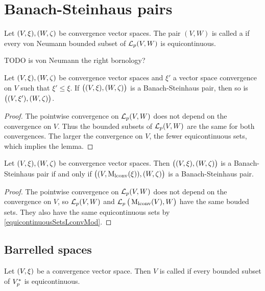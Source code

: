 \section{Banach-Steinhaus pairs}
\begin{definition}
Let $\sSet{V,\xi}, \sSet{W,\zeta}$ be convergence vector spaces. The pair $(V,W)$ is called a  if every von Neumann bounded subset of $\operatorname{\mathcal{L}}_p(V,W)$ is equicontinuous.
\end{definition}
TODO is von Neumann the right bornology?

\begin{lemma} \label{BanachSteinhausPairDomainInclusion}
Let $\sSet{V,\xi}, \sSet{W,\zeta}$ be convergence vector spaces and $\xi'$ a vector space convergence on $V$ such that $\xi'\leq \xi$. If $\big(\sSet{V,\xi}, \sSet{W,\zeta}\big)$ is a Banach-Steinhaus pair, then so is $\big(\sSet{V,\xi'}, \sSet{W,\zeta}\big)$.
\end{lemma}
\begin{proof}
The pointwise convergence on $\operatorname{\mathcal{L}}_p(V,W)$ does not depend on the convergence on $V$. Thus the bounded subsets of $\operatorname{\mathcal{L}}_p(V,W)$ are the same for both convergences. The larger the convergence on $V$, the fewer equicontinuous sets, which implies the lemma.
\end{proof}

\begin{proposition}
Let $\sSet{V,\xi}, \sSet{W,\zeta}$ be convergence vector spaces. Then $\big(\sSet{V,\xi}, \sSet{W,\zeta}\big)$ is a Banach-Steinhaus pair \textup{if and only if} $\big(\sSet{V,\lconvMod(\xi)}, \sSet{W,\zeta}\big)$ is a Banach-Steinhaus pair.
\end{proposition}
\begin{proof}
The pointwise convergence on $\operatorname{\mathcal{L}}_p(V,W)$ does not depend on the convergence on $V$, so $\operatorname{\mathcal{L}}_p(V,W)$ and $\operatorname{\mathcal{L}}_p\big(\operatorname{M_\text{lconv}}(V),W\big)$ have the same bouded sets. They also have the same equicontinuous sets by \ref{equicontinuousSetsLconvMod}.
\end{proof}

\subsection{Barrelled spaces}
\begin{definition}
Let $\sSet{V,\xi}$ be a convergence vector space. Then $V$ is called  if every bounded subset of ${V}^*_p$ is equicontinuous.
\end{definition}

